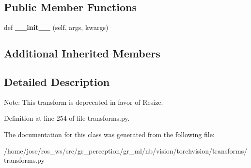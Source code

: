 \subsection*{Public Member Functions}
\begin{DoxyCompactItemize}
\item 
\mbox{\label{classtorchvision_1_1transforms_1_1transforms_1_1Scale_af2ff5b5105795cffeb6b8661863633d3}} 
def {\bfseries \+\_\+\+\_\+init\+\_\+\+\_\+} (self, args, kwargs)
\end{DoxyCompactItemize}
\subsection*{Additional Inherited Members}


\subsection{Detailed Description}
\begin{DoxyVerb}Note: This transform is deprecated in favor of Resize.
\end{DoxyVerb}
 

Definition at line 254 of file transforms.\+py.



The documentation for this class was generated from the following file\+:\begin{DoxyCompactItemize}
\item 
/home/jose/ros\+\_\+ws/src/gr\+\_\+perception/gr\+\_\+ml/nb/vision/torchvision/transforms/transforms.\+py\end{DoxyCompactItemize}
